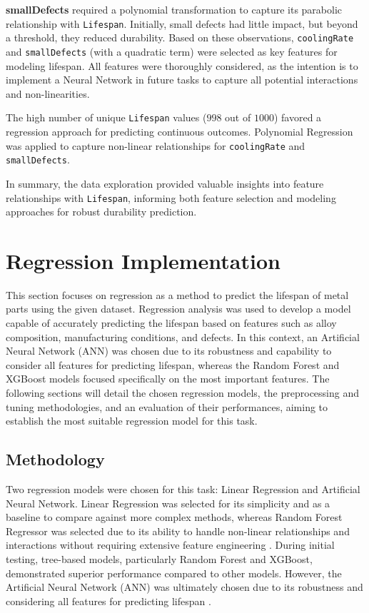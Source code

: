 \documentclass{article}
\begin{document}
\textbf{smallDefects} required a polynomial transformation to capture its parabolic relationship with \texttt{Lifespan}. Initially, small defects had little impact, but beyond a threshold, they reduced durability. Based on these observations, \texttt{coolingRate} and \texttt{smallDefects} (with a quadratic term) were selected as key features for modeling lifespan. All features were thoroughly considered, as the intention is to implement a Neural Network in future tasks to capture all potential interactions and non-linearities.

The high number of unique \texttt{Lifespan} values ($998$ out of $1000$) favored a regression approach for predicting continuous outcomes. Polynomial Regression was applied to capture non-linear relationships for \texttt{coolingRate} and \texttt{smallDefects}.

In summary, the data exploration provided valuable insights into feature relationships with \texttt{Lifespan}, informing both feature selection and modeling approaches for robust durability prediction.

\section{Regression Implementation}

This section focuses on regression as a method to predict the lifespan of metal parts using the given dataset. Regression analysis was used to develop a model capable of accurately predicting the lifespan based on features such as alloy composition, manufacturing conditions, and defects. In this context, an Artificial Neural Network (ANN) was chosen due to its robustness and capability to consider all features for predicting lifespan, whereas the Random Forest and XGBoost models focused specifically on the most important features. The following sections will detail the chosen regression models, the preprocessing and tuning methodologies, and an evaluation of their performances, aiming to establish the most suitable regression model for this task.

\subsection{Methodology}

Two regression models were chosen for this task: Linear Regression and Artificial Neural Network. Linear Regression was selected for its simplicity and as a baseline to compare against more complex methods, whereas Random Forest Regressor was selected due to its ability to handle non-linear relationships and interactions without requiring extensive feature engineering \parencite{gorz2023feature}. During initial testing, tree-based models, particularly Random Forest and XGBoost, demonstrated superior performance compared to other models. However, the Artificial Neural Network (ANN) was ultimately chosen due to its robustness and considering all features for predicting lifespan \parencite{jagtap2022activation, rajan2021regression}.
\end{document}
